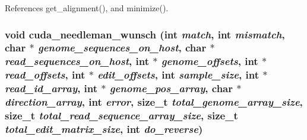 References get\_\-alignment(), and minimize().
\subsubsection[{cuda\_\-needleman\_\-wunsch}]{\setlength{\rightskip}{0pt plus 5cm}void cuda\_\-needleman\_\-wunsch (int {\em match}, \/  int {\em mismatch}, \/  char $\ast$ {\em genome\_\-sequences\_\-on\_\-host}, \/  char $\ast$ {\em read\_\-sequences\_\-on\_\-host}, \/  int $\ast$ {\em genome\_\-offsets}, \/  int $\ast$ {\em read\_\-offsets}, \/  int $\ast$ {\em edit\_\-offsets}, \/  int {\em sample\_\-size}, \/  int $\ast$ {\em read\_\-id\_\-array}, \/  int $\ast$ {\em genome\_\-pos\_\-array}, \/  char $\ast$ {\em direction\_\-array}, \/  int {\em error}, \/  size\_\-t {\em total\_\-genome\_\-array\_\-size}, \/  size\_\-t {\em total\_\-read\_\-sequence\_\-array\_\-size}, \/  size\_\-t {\em total\_\-edit\_\-matrix\_\-size}, \/  int {\em do\_\-reverse})}\label{cuda-functions_8cu_1bfc988c46a591bd7c9ce6e26b45f2d0}


